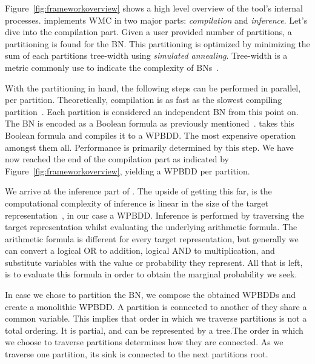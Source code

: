 Figure~\ref{fig:frameworkoverview} shows a high level overview of the tool's internal processes. \toolname implements WMC in two major parts: \emph{compilation} and \emph{inference}. Let's dive into the compilation part. Given a user provided number of partitions, a partitioning is found for the BN. This partitioning is optimized by minimizing the sum of each partitions tree-width using \emph{simulated annealing}. Tree-width is a metric commonly use to indicate the complexity of BNs~\cite{bollig2014width}.

With the partitioning in hand, the following steps can be performed in parallel, per partition. Theoretically, compilation is as fast as the slowest compiling partition~\cite{dal2018parallel}. Each partition is considered an independent BN from this point on. The BN is encoded as a Boolean formula as previously mentioned~\cite{chavira2008probabilistic}. \toolname takes this Boolean formula and compiles it to a WPBDD. The most expensive operation amongst them all. Performance is primarily determined by this step. We have now reached the end of the compilation part as indicated by Figure~\ref{fig:frameworkoverview}, yielding a WPBDD per partition.

We arrive at the inference part of \toolname. The upside of getting this far, is the computational complexity of inference is linear in the size of the target representation~\cite{darwiche2002knowledge}, in our case a WPBDD. Inference is performed by traversing the target representation whilst evaluating the underlying arithmetic formula. The arithmetic formula is different for every target representation, but generally we can convert a logical OR to addition, logical AND to multiplication, and substitute variables with the value or probability they represent. All that is left, is to evaluate this formula in order to obtain the marginal probability we seek.

In case we chose to partition the BN, we compose the obtained WPBDDs and create a monolithic WPBDD. A partition is connected to another of they share a common variable. This implies that order in which we traverse partitions is not a total ordering. It is partial, and can be represented by a tree.The order in which we choose to traverse partitions determines how they are connected. As we traverse one partition, its sink is connected to the next partitions root.

